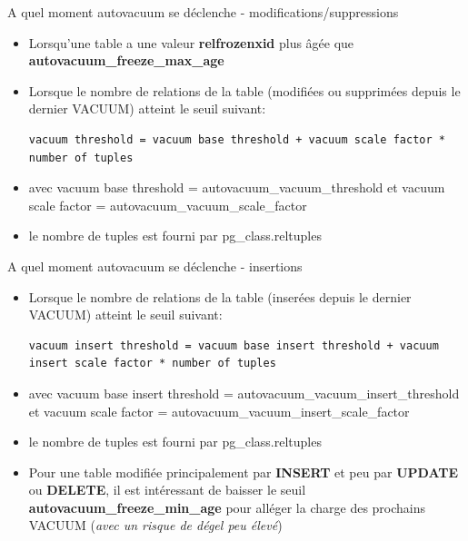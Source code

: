 
\begin{frame}[fragile]{A quel moment autovacuum se déclenche - modifications/suppressions}

\begin{itemize}
   \item Lorsqu'une table a une valeur \textbf{relfrozenxid} plus âgée que \textbf{autovacuum\_freeze\_max\_age}
   \item Lorsque le nombre de relations de la table (modifiées ou supprimées depuis le dernier VACUUM) atteint le seuil suivant:
\begin{tiny}
\begin{Verbatim}[commandchars=\\\{\}]
vacuum threshold = vacuum base threshold + vacuum scale factor * number of tuples
\end{Verbatim}
\end{tiny}
   \item avec vacuum base threshold = autovacuum\_vacuum\_threshold et vacuum scale factor = autovacuum\_vacuum\_scale\_factor
   \item le nombre de tuples est fourni par pg\_class.reltuples

\end{itemize}

\end{frame}


\begin{frame}[fragile]{A quel moment autovacuum se déclenche - insertions}

\begin{itemize}
   \item Lorsque le nombre de relations de la table (inserées depuis le dernier VACUUM) atteint le seuil suivant:
\begin{tiny}
\begin{Verbatim}[commandchars=\\\{\}]
vacuum insert threshold = vacuum base insert threshold + vacuum insert scale factor * number of tuples
\end{Verbatim}
\end{tiny}
   \item avec vacuum base insert threshold = autovacuum\_vacuum\_insert\_threshold et vacuum scale factor = autovacuum\_vacuum\_insert\_scale\_factor
   \item le nombre de tuples est fourni par pg\_class.reltuples
   \item Pour une table modifiée principalement par \textbf{INSERT} et peu par \textbf{UPDATE} ou \textbf{DELETE}, il est intéressant de baisser le seuil \textbf{autovacuum\_freeze\_min\_age} pour alléger la charge des prochains VACUUM (\textit{avec un risque de dégel peu élevé})

\end{itemize}

\end{frame}

